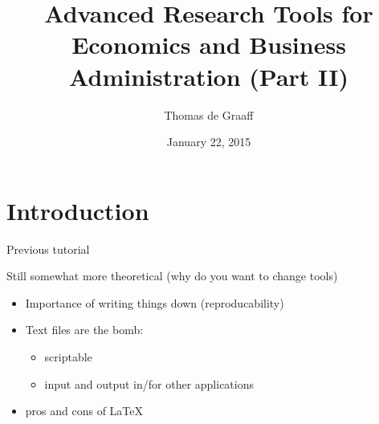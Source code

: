\documentclass[ignorenonframetext,]{beamer}
\title{Advanced Research Tools for Economics and Business Administration (Part
II)}
\author{Thomas de Graaff}
\date{January 22, 2015}
\begin{document}
\frame{\titlepage}

\section{Introduction}\label{introduction}

\begin{frame}{Previous tutorial}

Still somewhat more theoretical (why do you want to change tools)

\begin{itemize}
\item
  Importance of writing things down (reproducability)
\item
  Text files are the bomb:

  \begin{itemize}
  \itemsep1pt\parskip0pt
  \item
    scriptable
  \item
    input and output in/for other applications
  \end{itemize}
\item
  pros and cons of \LaTeX
\end{itemize}

\end{frame}
\end{document}
